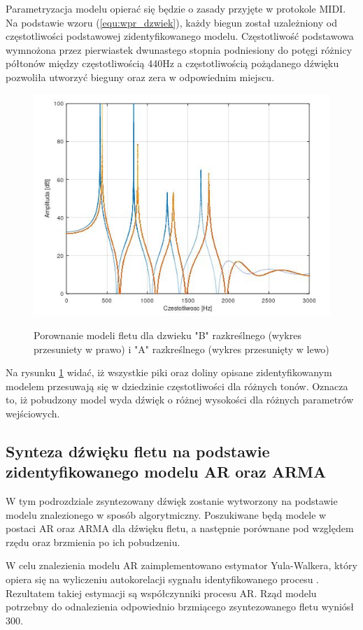 Parametryzacja modelu opierać się będzie o zasady przyjęte w protokole MIDI. 
Na podstawie wzoru (\ref{equ:wpr_dzwiek}), każdy biegun został uzależniony od częstotliwości podstawowej zidentyfikowanego modelu. Częstotliwość podstawowa wymnożona przez pierwiastek dwunastego stopnia podniesiony do potęgi różnicy półtonów między częstotliwością 440Hz a częstotliwością pożądanego dźwięku pozwoliła utworzyć bieguny oraz zera w odpowiednim miejscu.
\begin{figure}[H]
	\centering
	\includegraphics[width=12cm]{grafiki/Model_B_A}
	\label{rys:por_mod_flet}
	\captionsetup{justification=centering}
	\caption{Porownanie modeli fletu dla dzwieku "B" razkreślnego (wykres przesuniety w prawo) i "A" razkreślnego (wykres przesunięty w lewo)}
	\label{rys:por_mod_flet}
\end{figure}
Na rysunku \ref{rys:por_mod_flet} widać, iż wszystkie piki oraz doliny opisane zidentyfikowanym modelem przesuwają się w dziedzinie częstotliwości dla różnych tonów. Oznacza to, iż pobudzony model wyda dźwięk o różnej wysokości dla różnych parametrów wejściowych.


\subsection{Synteza dźwięku fletu na podstawie zidentyfikowanego modelu AR oraz ARMA}
W tym podrozdziale zsyntezowany dźwięk zostanie wytworzony na podstawie modelu znalezionego w sposób algorytmiczny. Poszukiwane będą modele w postaci AR oraz ARMA dla dźwięku fletu, a następnie porównane pod względem rzędu oraz brzmienia po ich pobudzeniu.

W celu znalezienia modelu AR zaimplementowano estymator Yula-Walkera, który opiera się na wyliczeniu autokorelacji sygnału identyfikowanego procesu \cite{Y_W}. Rezultatem takiej estymacji są współczynniki procesu AR. Rząd modelu potrzebny do odnalezienia odpowiednio brzmiącego zsyntezowanego fletu wyniósł 300.

